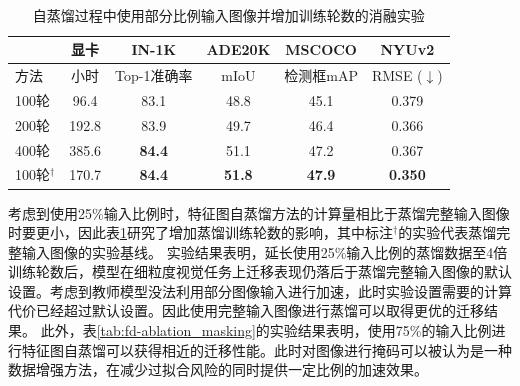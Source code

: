 \begin{table}
        \centering
        \caption{自蒸馏过程中使用部分比例输入图像并增加训练轮数的消融实验}
    \
        \begin{tabular}{lccccc}
            \toprule
               & 显卡 & IN-1K & ADE20K & MSCOCO & NYUv2 \\
                \midrule
               方法 & 小时 &  Top-1准确率   &  mIoU  & 检测框mAP & RMSE\scriptsize{ ($\downarrow$)}\\
              \midrule
              100轮 & 96.4 & 83.1 & 48.8 & 45.1&  0.379 \\
              200轮 & 192.8 & 83.9 & 49.7 & 46.4& 0.366 \\
              400轮 & 385.6 & \textbf{84.4} & 51.1 & 47.2&  0.367 \\
              100轮$^{\dag}$ & 170.7 & \textbf{84.4} & \textbf{51.8} & \textbf{47.9} & \textbf{0.350} \\
            \bottomrule
        \end{tabular}
        \label{tab:fd-ablate_longer_maskinput}
\end{table}

考虑到使用25\%输入比例时，特征图自蒸馏方法的计算量相比于蒸馏完整输入图像时要更小，因此表\ref{tab:fd-ablate_longer_maskinput}研究了增加蒸馏训练轮数的影响，其中标注$^{\dag}$的实验代表蒸馏完整输入图像的实验基线。
实验结果表明，延长使用25\%输入比例的蒸馏数据至4倍训练轮数后，模型在细粒度视觉任务上迁移表现仍落后于蒸馏完整输入图像的默认设置。考虑到教师模型没法利用部分图像输入进行加速，此时实验设置需要的计算代价已经超过默认设置。因此使用完整输入图像进行蒸馏可以取得更优的迁移结果。
此外，表\ref{tab:fd-ablation_masking}的实验结果表明，使用75\%的输入比例进行特征图自蒸馏可以获得相近的迁移性能。此时对图像进行掩码可以被认为是一种数据增强方法，在减少过拟合风险的同时提供一定比例的加速效果。


